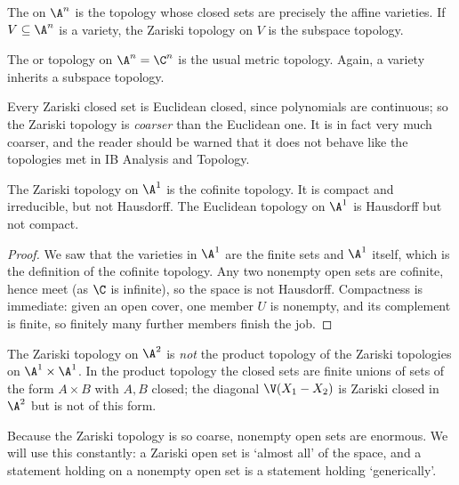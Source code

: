 \begin{definition}
	The  on $\A^n$ is the topology whose closed sets are precisely the affine varieties. If $V \subseteq \A^n$ is a variety, the Zariski topology on $V$ is the subspace topology.
\end{definition}

\begin{definition}
	The  or  topology on $\A^n = \C^n$ is the usual metric topology. Again, a variety inherits a subspace topology.
\end{definition}

Every Zariski closed set is Euclidean closed, since polynomials are continuous; so the Zariski topology is \emph{coarser} than the Euclidean one. It is in fact very much coarser, and the reader should be warned that it does not behave like the topologies met in IB Analysis and Topology.

\begin{proposition}
	The Zariski topology on $\A^1$ is the cofinite topology. It is compact and irreducible, but not Hausdorff. The Euclidean topology on $\A^1$ is Hausdorff but not compact.
\end{proposition}

\begin{proof}
	We saw that the varieties in $\A^1$ are the finite sets and $\A^1$ itself, which is the definition of the cofinite topology. Any two nonempty open sets are cofinite, hence meet (as $\C$ is infinite), so the space is not Hausdorff. Compactness is immediate: given an open cover, one member $U$ is nonempty, and its complement is finite, so finitely many further members finish the job.
\end{proof}

\begin{remark}
	The Zariski topology on $\A^2$ is \emph{not} the product topology of the Zariski topologies on $\A^1 \times \A^1$. In the product topology the closed sets are finite unions of sets of the form $A \times B$ with $A, B$ closed; the diagonal $\V(X_1 - X_2)$ is Zariski closed in $\A^2$ but is not of this form.
\end{remark}

Because the Zariski topology is so coarse, nonempty open sets are enormous. We will use this constantly: a Zariski open set is `almost all' of the space, and a statement holding on a nonempty open set is a statement holding `generically'.

